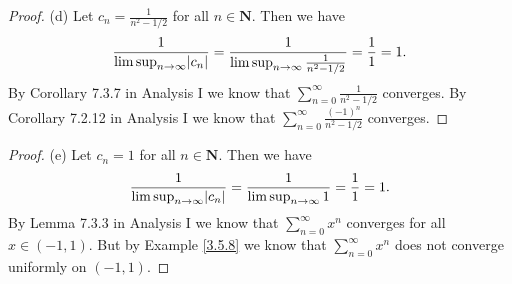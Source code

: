 \begin{proof}{(d)}
    Let \(c_n = \frac{1}{n^2 - 1 / 2}\) for all \(n \in \mathbf{N}\).
    Then we have
    \[
        \frac{1}{\limsup_{n \to \infty} \abs*{c_n}} = \frac{1}{\limsup_{n \to \infty} \frac{1}{n^2 - 1 / 2}} = \frac{1}{1} = 1.
    \]
    By Corollary 7.3.7 in Analysis I we know that \(\sum_{n = 0}^\infty \frac{1}{n^2 - 1 / 2}\) converges.
    By Corollary 7.2.12 in Analysis I we know that \(\sum_{n = 0}^\infty \frac{(-1)^n}{n^2 - 1 / 2}\) converges.
\end{proof}

\begin{proof}{(e)}
    Let \(c_n = 1\) for all \(n \in \mathbf{N}\).
    Then we have
    \[
        \frac{1}{\limsup_{n \to \infty} \abs*{c_n}} = \frac{1}{\limsup_{n \to \infty} 1} = \frac{1}{1} = 1.
    \]
    By Lemma 7.3.3 in Analysis I we know that \(\sum_{n = 0}^\infty x^n\) converges for all \(x \in (-1, 1)\).
    But by Example \ref{3.5.8} we know that \(\sum_{n = 0}^\infty x^n\) does not converge uniformly on \((-1, 1)\).
\end{proof}